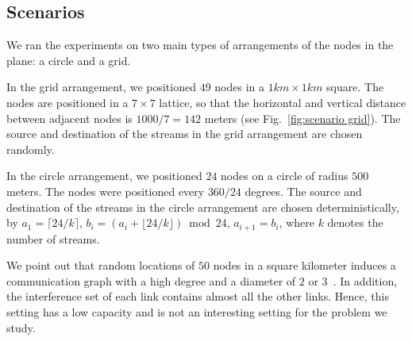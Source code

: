 \documentclass[11pt]{article}
\newenvironment{proof sketch}[1]{\noindent {\emph{Proof sketch of #1:}}}{\hfill \qed}
\begin{document}

\subsection{Scenarios}
We ran the experiments on two main types of arrangements of the nodes
in the plane: a circle and a grid.

\begin{inparaenum}[(1)]%
\item In the grid arrangement, we positioned $49$ nodes in a
  $1km\times 1km$ square. The nodes are positioned in a $7\times 7$
  lattice, so that the horizontal and vertical distance between
  adjacent nodes is $1000/7=142$ meters (see Fig.~\ref{fig:scenario
    grid}).  The source and destination of the streams in the grid
  arrangement are chosen randomly.

\item In the circle arrangement, we positioned $24$ nodes on a circle
  of radius $500$ meters.  The nodes were positioned every $360/24$
  degrees. %
  The source and destination of the streams in the circle arrangement
  are chosen deterministically, by $a_1=\lceil 24/k \rceil$, $b_i=(a_i
  + \lfloor 24/k \rfloor) \bmod 24$, $a_{i+1}=b_i$, where $k$ denotes
  the number of streams.
\end{inparaenum}%

We point out that random locations of $50$ nodes in a square kilometer
induces a communication graph with a high degree and a diameter of $2$
or $3$~\cite{marina2010topology}. In addition, the interference set of
each link contains almost all the other links. Hence, this setting has
a low capacity and is not an interesting setting for the problem we
study.
\end{document}
